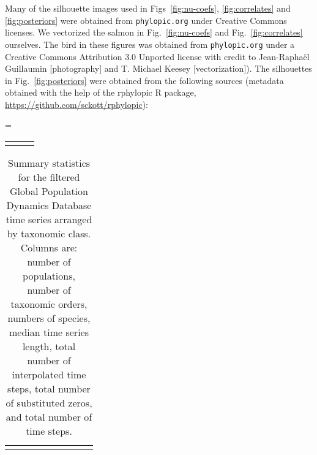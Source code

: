 Many of the silhouette images used in Figs~\ref{fig:nu-coefs},
\ref{fig:correlates} and \ref{fig:posteriors} were obtained from
\texttt{phylopic.org} under Creative Commons licenses. We vectorized the
salmon in Fig.~\ref{fig:nu-coefs} and Fig.~\ref{fig:correlates} ourselves. The
bird in these figures was obtained from \texttt{phylopic.org} under a Creative
Commons Attribution 3.0 Unported license with credit to Jean-Raphaël
Guillaumin {[}photography{]} and T. Michael Keesey {[}vectorization{]}). The
silhouettes in Fig.~\ref{fig:posteriors} were obtained from the following
sources (metadata obtained with the help of the rphylopic R package,
\url{https://github.com/sckott/rphylopic}):

\LTcapwidth=\textwidth
\begin{footnotesize}
\begin{longtable}{>{\RaggedRight}m{3.2cm}>{\RaggedRight}p{6.5cm}>{\RaggedRight}p{5.0cm}}
\toprule

\label{tab:phylopic}
\end{longtable}
\end{footnotesize}




%

\clearpage
\renewcommand{\thetable}{S\arabic{table}}
\setcounter{table}{0}

\begin{table}
\begin{footnotesize}

\caption[Summary statistics for the filtered Global Population Dynamics
  Database time series arranged by taxonomic class.]{Summary statistics for the filtered Global Population Dynamics
  Database time series arranged by taxonomic class. Columns are: number of
  populations, number of taxonomic orders, numbers of species, median time
  series length, total number of interpolated time steps, total number of
  substituted zeros, and total number of time steps.}

\smallskip
\begin{tabular}{lrrrrrrrr}
\toprule

\label{tab:stats}
\end{tabular}
\end{footnotesize}
\end{table}

